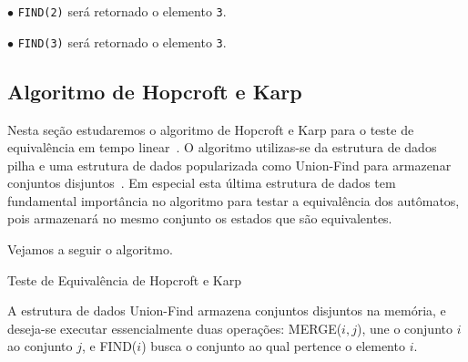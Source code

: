 \documentclass[
	12pt,				%
	openany,
	oneside,
	a4paper,			%
	english,			%
	brazil				%
	]{abntex2}
\begin{document}
\begin{alineas}
  \item[$\bullet$]
    \texttt{FIND(2)} será retornado o elemento \texttt{3}.

  \item[$\bullet$]
    \texttt{FIND(3)} será retornado o elemento \texttt{3}.
  \end{alineas}




\subsection {Algoritmo de Hopcroft e Karp}

  Nesta seção estudaremos o algoritmo de Hopcroft e Karp para o teste de equivalência em tempo linear~\cite{hoka71}. O algoritmo utilizas-se da estrutura de dados pilha e uma estrutura de dados popularizada como Union-Find para armazenar conjuntos disjuntos~\cite{cormen}. Em especial esta última estrutura de dados tem fundamental importância no algoritmo para testar a equivalência dos autômatos, pois armazenará no mesmo conjunto os estados que são equivalentes.

  Vejamos a seguir o algoritmo.

  \begin{algorithm}[H]
    \caption{Teste de Equivalência de Hopcroft e Karp}
    \label{alg03}
  \end{algorithm}


  A estrutura de dados Union-Find armazena conjuntos disjuntos na memória, e deseja-se executar essencialmente duas operações: MERGE($i, j$), une o conjunto $i$ ao conjunto $j$, e FIND($i$) busca o conjunto ao qual pertence o elemento $i$.
\end{document}
